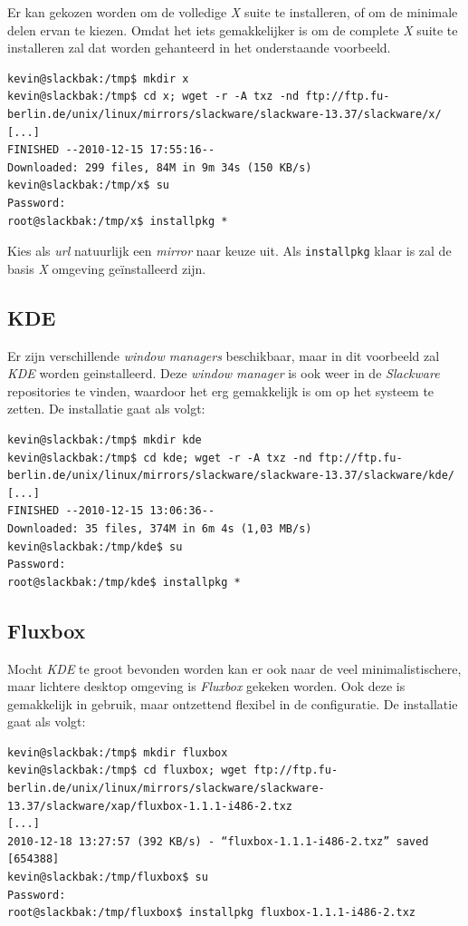 Er kan gekozen worden om de volledige \emph{X} suite te installeren, of om de minimale delen ervan te kiezen. Omdat het iets gemakkelijker is om de complete \emph{X} suite te installeren zal dat worden gehanteerd in het onderstaande voorbeeld. 
\begin{lstlisting}
kevin@slackbak:/tmp$ mkdir x
kevin@slackbak:/tmp$ cd x; wget -r -A txz -nd ftp://ftp.fu-berlin.de/unix/linux/mirrors/slackware/slackware-13.37/slackware/x/
[...]
FINISHED --2010-12-15 17:55:16--
Downloaded: 299 files, 84M in 9m 34s (150 KB/s)
kevin@slackbak:/tmp/x$ su
Password: 
root@slackbak:/tmp/x$ installpkg *
\end{lstlisting}%
Kies als \emph{url} natuurlijk een \emph{mirror} naar keuze uit. Als \texttt{installpkg} klaar is zal de basis \emph{X} omgeving ge\"{i}nstalleerd zijn. 

\subsection{KDE}
Er zijn verschillende \emph{window managers} beschikbaar, maar in dit voorbeeld zal \emph{KDE} worden geinstalleerd. Deze \emph{window manager} is ook weer in de \emph{Slackware} repositories te vinden, waardoor het erg gemakkelijk is om op het systeem te zetten. De installatie gaat als volgt:
\begin{lstlisting}
kevin@slackbak:/tmp$ mkdir kde
kevin@slackbak:/tmp$ cd kde; wget -r -A txz -nd ftp://ftp.fu-berlin.de/unix/linux/mirrors/slackware/slackware-13.37/slackware/kde/
[...]
FINISHED --2010-12-15 13:06:36--
Downloaded: 35 files, 374M in 6m 4s (1,03 MB/s)
kevin@slackbak:/tmp/kde$ su
Password: 
root@slackbak:/tmp/kde$ installpkg *
\end{lstlisting}

\subsection{Fluxbox}
Mocht \emph{KDE} te groot bevonden worden kan er ook naar de veel minimalistischere, maar lichtere desktop omgeving is \emph{Fluxbox} gekeken worden. Ook deze is gemakkelijk in gebruik, maar ontzettend flexibel in de configuratie. De installatie gaat als volgt:
\begin{lstlisting}
kevin@slackbak:/tmp$ mkdir fluxbox
kevin@slackbak:/tmp$ cd fluxbox; wget ftp://ftp.fu-berlin.de/unix/linux/mirrors/slackware/slackware-13.37/slackware/xap/fluxbox-1.1.1-i486-2.txz
[...]
2010-12-18 13:27:57 (392 KB/s) - “fluxbox-1.1.1-i486-2.txz” saved [654388]
kevin@slackbak:/tmp/fluxbox$ su
Password: 
root@slackbak:/tmp/fluxbox$ installpkg fluxbox-1.1.1-i486-2.txz
\end{lstlisting}

